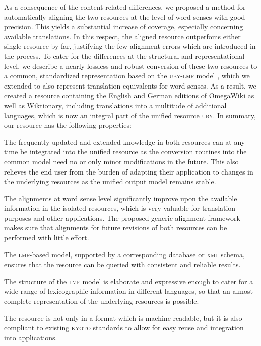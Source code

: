 \documentclass[output=paper]{LSP/langsci}
\begin{document}
As a consequence of the content-related differences, we proposed a method for automatically aligning the two resources at the level of word senses with good precision. This yields a substantial increase of coverage, especially concerning available translations. In this respect, the aligned resource outperfoms either single resource by far, justifying the few alignment errors which are introduced in the process. To cater for the differences at the structural and representational level, we describe a nearly lossless and robust conversion of these two resources to a common, standardized representation based on the \textsc{uby-lmf} model \citep{EckleKohler12}, which we extended to also represent translation equivalents for word senses. As a result, we created a resource containing the English and German editions of OmegaWiki as well as Wiktionary, including translations into a multitude of additional languages, which is now an integral part of the unified resource \textsc{uby}. In summary, our resource has the following properties:

\begin{description}\sloppy
\item[Continuously updated lexical-semantic knowledge:] The frequently updated and extended knowledge in both resources can at any time be integrated into the unified resource as the conversion routines into the common model need no or only minor modifications in the future. This also relieves the end user from the burden of adapting their application to changes in the underlying resources as the unified output model remains stable. 
\item[High coverage:] The alignments at word sense level significantly improve  upon the available information in the isolated resources, which is very valuable for translation purposes and other applications. The proposed generic alignment framework makes sure that alignments for future revisions of both resources can be performed with little effort.

  
\item[A standardized structure:] The \textsc{lmf}-based model, supported by a corresponding database or \textsc{xml} schema, ensures that the resource can be queried with consistent and reliable results. 
\item[Elaborate structure:] The structure of the \textsc{lmf} model is elaborate and expressive enough to cater for a wide range of lexicographic information in different languages, so that an almost complete representation of the underlying resources is possible.
\item[Interoperability:] The resource is not only in a format which is machine readable, but it is also compliant to existing \textsc{kyoto} standards to allow for easy reuse and integration into applications.
\end{description}
\end{document}
